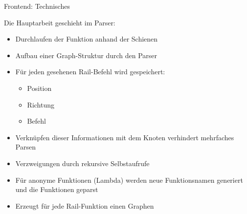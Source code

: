 \begin{frame}{Frontend: Technisches}

Die Hauptarbeit geschieht im Parser:
\pause
\begin{itemize}
	\item Durchlaufen der Funktion anhand der Schienen
	\pause
	\item Aufbau einer Graph-Struktur durch den Parser
	\pause
	\item F\"ur jeden gesehenen Rail-Befehl wird gespeichert:
	\pause
	\begin{itemize}
		\item Position
		\pause
		\item Richtung
		\pause
		\item Befehl
		\pause
	\end{itemize}
	\item Verkn\"upfen dieser Informationen mit dem Knoten verhindert mehrfaches Parsen
	\pause
	\item Verzweigungen durch rekursive Selbstaufrufe
	\pause
	\item F\"ur anonyme Funktionen (Lambda) werden neue Funktionsnamen generiert und die Funktionen geparst
	\pause
	\item Erzeugt f\"ur jede Rail-Funktion einen Graphen
\end{itemize}

\end{frame}
